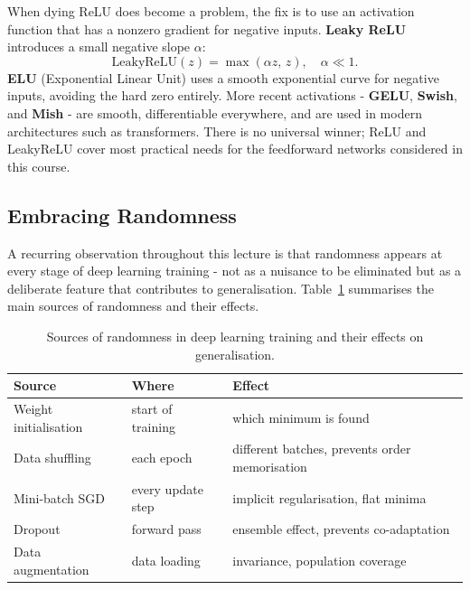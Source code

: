When dying ReLU does become a problem, the fix is to use an activation function that has a nonzero gradient for negative inputs. \textbf{Leaky ReLU} introduces a small negative slope $\alpha$:
\begin{equation}
    \text{LeakyReLU}(z) = \max(\alpha z,\, z), \quad \alpha \ll 1.
\end{equation}
\textbf{ELU} (Exponential Linear Unit) uses a smooth exponential curve for negative inputs, avoiding the hard zero entirely. More recent activations - \textbf{GELU}, \textbf{Swish}, and \textbf{Mish} - are smooth, differentiable everywhere, and are used in modern architectures such as transformers. There is no universal winner; ReLU and LeakyReLU cover most practical needs for the feedforward networks considered in this course.


\subsection{Embracing Randomness}

A recurring observation throughout this lecture is that randomness appears at every stage of deep learning training - not as a nuisance to be eliminated but as a deliberate feature that contributes to generalisation. Table~\ref{tab:randomness} summarises the main sources of randomness and their effects.

\begin{table}[h]
\centering
\begin{tabular}{lll}
\toprule
\textbf{Source} & \textbf{Where} & \textbf{Effect} \\
\midrule
Weight initialisation & start of training & which minimum is found \\
Data shuffling & each epoch & different batches, prevents order memorisation \\
Mini-batch SGD & every update step & implicit regularisation, flat minima \\
Dropout & forward pass & ensemble effect, prevents co-adaptation \\
Data augmentation & data loading & invariance, population coverage \\
\bottomrule
\end{tabular}
\caption{Sources of randomness in deep learning training and their effects on generalisation.}
\label{tab:randomness}
\end{table}

